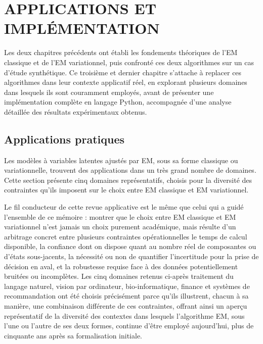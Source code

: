 \chapter{APPLICATIONS ET IMPLÉMENTATION}
Les deux chapitres précédents ont établi les fondements théoriques de l'EM classique et de l'EM variationnel, puis confronté ces deux algorithmes sur un cas d'étude synthétique. Ce troisième et dernier chapitre s'attache à replacer ces algorithmes dans leur contexte applicatif réel, en explorant plusieurs domaines dans lesquels ils sont couramment employés, avant de présenter une implémentation complète en langage Python, accompagnée d'une analyse détaillée des résultats expérimentaux obtenus.

\section{Applications pratiques}
Les modèles à variables latentes ajustés par EM, sous sa forme classique ou variationnelle, trouvent des applications dans un très grand nombre de domaines. Cette section présente cinq domaines représentatifs, choisis pour la diversité des contraintes qu'ils imposent sur le choix entre EM classique et EM variationnel.

Le fil conducteur de cette revue applicative est le même que celui qui a guidé l'ensemble de ce mémoire : montrer que le choix entre EM classique et EM variationnel n'est jamais un choix purement académique, mais résulte d'un arbitrage concret entre plusieurs contraintes opérationnelles  le temps de calcul disponible, la confiance dont on dispose quant au nombre réel de composantes ou d'états sous-jacents, la nécessité ou non de quantifier l'incertitude pour la prise de décision en aval, et la robustesse requise face à des données potentiellement bruitées ou incomplètes. Les cinq domaines retenus ci-après  traitement du langage naturel, vision par ordinateur, bio-informatique, finance et systèmes de recommandation  ont été choisis précisément parce qu'ils illustrent, chacun à sa manière, une combinaison différente de ces contraintes, offrant ainsi un aperçu représentatif de la diversité des contextes dans lesquels l'algorithme EM, sous l'une ou l'autre de ses deux formes, continue d'être employé aujourd'hui, plus de cinquante ans après sa formalisation initiale.

